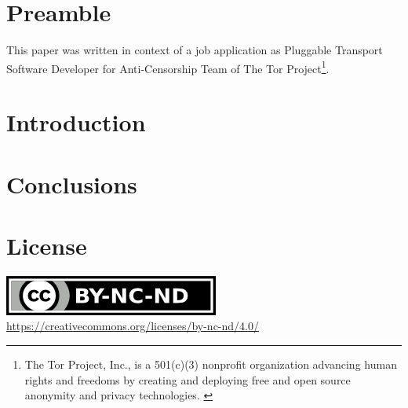 \documentclass[sigconf, screen]{acmart}
\begin{document}
\maketitle
\section*{Preamble}
\label{s:preamble}
This paper was written in context of a job application as Pluggable Transport Software Developer for Anti-Censorship Team of The Tor Project\footnote{The Tor Project, Inc., is a 501(c)(3) nonprofit organization advancing human rights and freedoms by creating and deploying free and open source anonymity and privacy technologies. \cite{JobDes}}. 



\section{Introduction}
\label{s:introduction}





\section{Conclusions}	%
\label{s:conclusions}




\section*{License}
\label{s:license}
\begin{center}
	\includegraphics{by-nc-nd.png} \\
	\url{https://creativecommons.org/licenses/by-nc-nd/4.0/}
\end{center}
\end{document}
